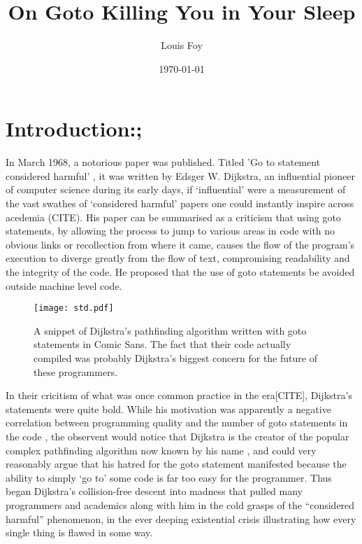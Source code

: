 \documentclass{journal}
\title{On Goto Killing You in Your Sleep}
\author{Louis Foy}
\date{\today}
\begin{document}
\maketitle


\section{\textunderscore \textunderscore Introduction:;}
In March 1968, a notorious paper was published. Titled 'Go to statement considered harmful' \cite{goto}, it was written by Edsger W. Dijkstra, an influential pioneer of computer science during its early days, if `influential' were a measurement of the vast swathes of `considered harmful' papers one could instantly inspire across acedemia (CITE). His paper can be summarised as a criticism that using goto statements, by allowing the process to jump to various areas in code with no obvious links or recollection from where it came, causes the flow of the program's execution to diverge greatly from the flow of text, compromising readability and the integrity of the code. He proposed that the use of goto statements be avoided outside machine level code.

\begin{figure}
\texttt{[image: std.pdf]}
\caption{A snippet of Dijkstra's pathfinding algorithm written with goto statements in Comic Sans. The fact that their code actually compiled was probably Dijkstra's biggest concern for the future of these programmers.}
\label{fig:pathfinding}
\end{figure}

In their cricitism of what was once common practice in the era[CITE], Dijkstra's statements were quite bold. While his motivation was apparently a negative correlation between programming quality and the number of goto statements in the code \cite{goto}, the observent would notice that Dijkstra is the creator of the popular complex pathfinding algorithm now known by his name \cite{pathfinding}, and could very reasonably argue that his hatred for the goto statement manifested because the ability to simply `go to' some code is far too easy for the programmer. Thus began Dijkstra's collision-free descent into madness that pulled many programmers and academics along with him in the cold grasps of the ``considered harmful'' phenomenon, in the ever deeping existential crisis illustrating how every single thing is flawed in some way.
\end{document}

